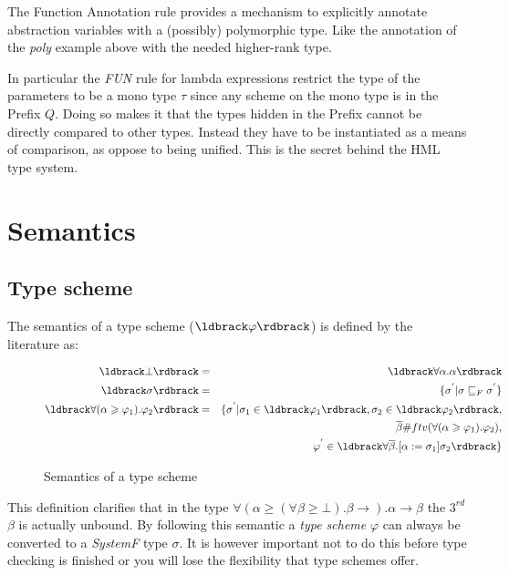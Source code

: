 \documentclass[twoside, titlepage, openright, a4paper]{book}
\renewcommand{\geq}{\geqslant}
\newcommand{\br}[1]{\ldbrack #1 \rdbrack}
\begin{document}
The Function Annotation rule provides a mechanism to explicitly annotate abstraction variables with a (possibly) polymorphic type. Like the annotation of the \textit{poly} example above with the needed higher-rank type.

In particular the \textit{FUN} rule for lambda expressions restrict the type of the parameters to be a mono type $\tau$ since any scheme on the mono type is in the Prefix $Q$. Doing so makes it that the types hidden in the Prefix cannot be directly compared to other types. Instead they have to be instantiated as a means of comparison, as oppose to being unified. This is the secret behind the HML type system.  

\section{Semantics}
\subsection{Type scheme}
The semantics of a type scheme ($\br{\varphi}$) is defined by the literature\cite{HML} as:
\begin{figure}[H]
\begin{eqnarray*}
\br{\bot} & = & \br{\forall\alpha . \alpha} \\
\br{\sigma} & = & \{ \sigma^{'} | \sigma \sqsubseteq_F \sigma^{'} \} \\
\br{\forall(\alpha \geq \varphi_1).\varphi_2} & = & \{ \sigma^{'} | \sigma_1  \in \br{\varphi_1}, \sigma_2 \in \br{\varphi_2}, \\ 
   &\mbox{   }& \mbox{   } \overline{\beta} \# ftv(\forall(\alpha \geq \varphi_1).\varphi_2), \\
   &\mbox{   }& \mbox{   } \varphi^{'} \in \br{\forall\overline{\beta}.\lbrack \alpha := \sigma_1 \rbrack\sigma_2}  \} 
\end{eqnarray*}
\caption{Semantics of a type scheme}
\end{figure}

This definition clarifies that in the type $\forall(\alpha \geq (\forall \beta \geq \bot). \beta \rightarrow ). \alpha \rightarrow \beta$ the $3^{rd}$ $\beta$ is actually unbound. By following this semantic a \emph{type scheme} $\varphi$ can always be converted to a \emph{SystemF} type $\sigma$. It is however important not to do this before type checking is finished or you will lose the flexibility that type schemes offer.
\end{document}
